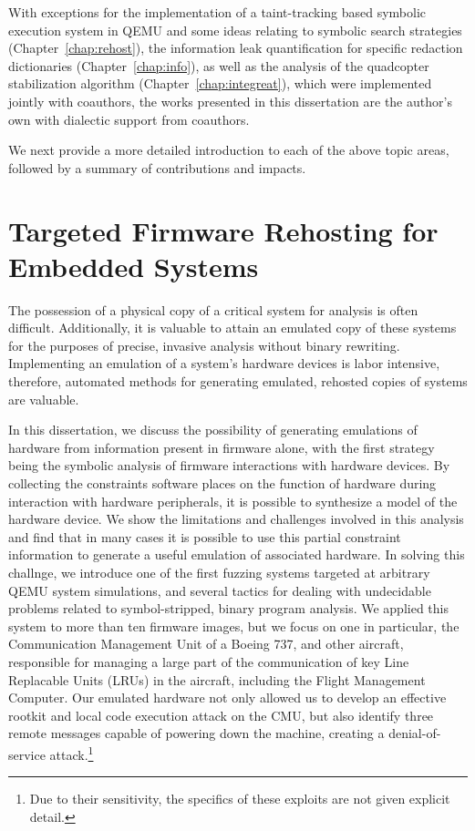 With exceptions for the implementation of a taint-tracking based symbolic execution system in QEMU and some ideas relating to symbolic search strategies (Chapter~\ref{chap:rehost}), the information leak quantification for specific redaction dictionaries (Chapter~\ref{chap:info}), as well as the analysis of the quadcopter stabilization algorithm (Chapter~\ref{chap:integreat}), which were implemented jointly with coauthors, the works presented in this dissertation are the author's own with dialectic support from coauthors.

We next provide a more detailed introduction to each of the above topic areas, followed by a summary of contributions and impacts.

\section{Targeted Firmware Rehosting for Embedded Systems}

The possession of a physical copy of a critical system for analysis is often difficult.
Additionally, it is valuable to attain an emulated copy of these systems for the purposes of precise, invasive analysis without binary rewriting.
Implementing an emulation of a system's hardware devices is labor intensive, therefore, automated methods for generating emulated, rehosted copies of systems are valuable.

In this dissertation, we discuss the possibility of generating emulations of hardware from information present in firmware alone, with the first strategy being the symbolic analysis of firmware interactions with hardware devices.
By collecting the constraints software places on the function of hardware during interaction with hardware peripherals, it is possible to synthesize a model of the hardware device.
We show the limitations and challenges involved in this analysis and find that in many cases it is possible to use this partial constraint information to generate a useful emulation of associated hardware.
In solving this challnge, we introduce one of the first fuzzing systems targeted at arbitrary QEMU system simulations, and several tactics for dealing with undecidable problems related to symbol-stripped, binary program analysis.
We applied this system to more than ten firmware images, but we focus on one in particular, the Communication Management Unit of a Boeing 737, and other aircraft, responsible for managing a large part of the communication of key Line Replacable Units (LRUs) in the aircraft, including the Flight Management Computer.
Our emulated hardware not only allowed us to develop an effective rootkit and local code execution attack on the CMU, but also identify three remote messages capable of powering down the machine, creating a denial-of-service attack.\footnote{Due to their sensitivity, the specifics of these exploits are not given explicit detail.}

